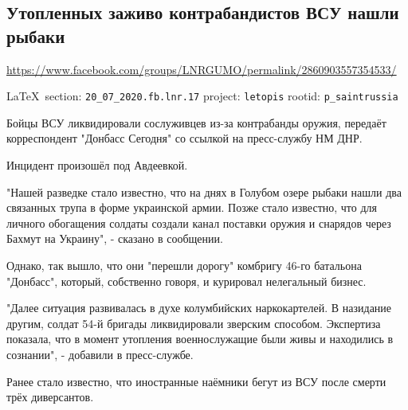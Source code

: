  
 
\subsection{Утопленных заживо контрабандистов ВСУ нашли рыбаки}
\url{https://www.facebook.com/groups/LNRGUMO/permalink/2860903557354533/}
  
\vspace{0.5cm}
{\small\LaTeX~section: \verb|20_07_2020.fb.lnr.17| project: \verb|letopis| rootid: \verb|p_saintrussia|}
\vspace{0.5cm}
  

Бойцы ВСУ ликвидировали сослуживцев из-за контрабанды оружия, передаёт
корреспондент "Донбасс Сегодня" со ссылкой на пресс-службу НМ ДНР.

Инцидент произошёл под Авдеевкой.

"Нашей разведке стало известно, что на днях в Голубом озере рыбаки нашли два связанных трупа в форме украинской армии. Позже стало известно, что для личного обогащения солдаты создали канал поставки оружия и снарядов через Бахмут на Украину", - сказано в сообщении.

Однако, так вышло, что они "перешли дорогу" комбригу 46-го батальона "Донбасс", который, собственно говоря, и курировал нелегальный бизнес.

"Далее ситуация развивалась в духе колумбийских наркокартелей. В назидание другим, солдат 54-й бригады ликвидировали зверским способом. Экспертиза показала, что в момент утопления военнослужащие были живы и находились в сознании", - добавили в пресс-службе.

Ранее стало известно, что иностранные наёмники бегут из ВСУ после смерти трёх диверсантов.
